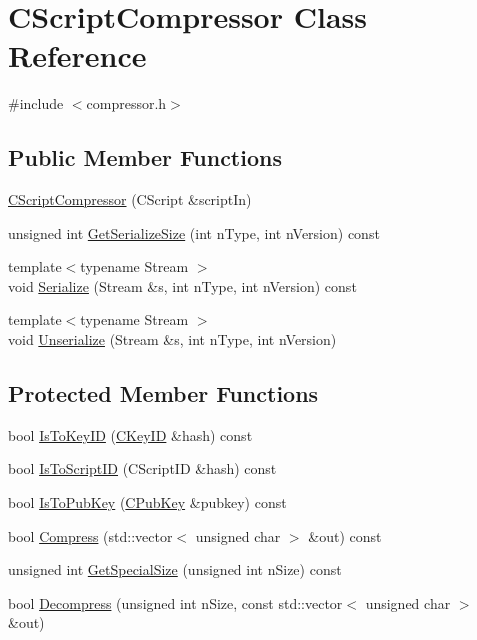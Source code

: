\hypertarget{class_c_script_compressor}{}\section{C\+Script\+Compressor Class Reference}
\label{class_c_script_compressor}


{\ttfamily \#include $<$compressor.\+h$>$}

\subsection*{Public Member Functions}
\begin{DoxyCompactItemize}
\item 
\mbox{\hyperlink{class_c_script_compressor_aad31afe3d14387b163b5c043e834ca2b}{C\+Script\+Compressor}} (C\+Script \&script\+In)
\item 
unsigned int \mbox{\hyperlink{class_c_script_compressor_afd6f2bea6c0ba2d34f770997e96bc23d}{Get\+Serialize\+Size}} (int n\+Type, int n\+Version) const
\item 
{\footnotesize template$<$typename Stream $>$ }\\void \mbox{\hyperlink{class_c_script_compressor_a5702b644df500ddd11c56d0490e8be44}{Serialize}} (Stream \&s, int n\+Type, int n\+Version) const
\item 
{\footnotesize template$<$typename Stream $>$ }\\void \mbox{\hyperlink{class_c_script_compressor_a016fa6e3d2735d95fcf773271da073d5}{Unserialize}} (Stream \&s, int n\+Type, int n\+Version)
\end{DoxyCompactItemize}
\subsection*{Protected Member Functions}
\begin{DoxyCompactItemize}
\item 
bool \mbox{\hyperlink{class_c_script_compressor_a38e2dcfce62bb157b55536d73748f556}{Is\+To\+Key\+ID}} (\mbox{\hyperlink{class_c_key_i_d}{C\+Key\+ID}} \&hash) const
\item 
bool \mbox{\hyperlink{class_c_script_compressor_a7a995d1064299a58d4f2e9f0ac205d07}{Is\+To\+Script\+ID}} (C\+Script\+ID \&hash) const
\item 
bool \mbox{\hyperlink{class_c_script_compressor_a19a67455a106e2e0528bc97cb60d2391}{Is\+To\+Pub\+Key}} (\mbox{\hyperlink{class_c_pub_key}{C\+Pub\+Key}} \&pubkey) const
\item 
bool \mbox{\hyperlink{class_c_script_compressor_a563ba251e7720841b4d5fc30ebd736e6}{Compress}} (std\+::vector$<$ unsigned char $>$ \&out) const
\item 
unsigned int \mbox{\hyperlink{class_c_script_compressor_aa702c1ed206804d016da3600e02d2169}{Get\+Special\+Size}} (unsigned int n\+Size) const
\item 
bool \mbox{\hyperlink{class_c_script_compressor_a1feb663ddab3a45218c7cb02f2a25717}{Decompress}} (unsigned int n\+Size, const std\+::vector$<$ unsigned char $>$ \&out)
\end{DoxyCompactItemize}
